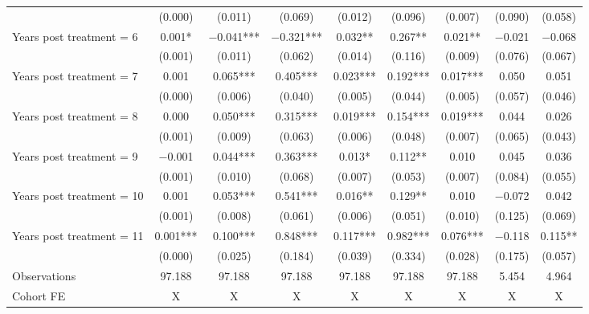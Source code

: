 \begin{table}[H]
{\begin{threeparttable}
\begin{tabular}[t]{lcccccccc}
 & (\num{0.000}) & (\num{0.011}) & (\num{0.069}) & (\num{0.012}) & (\num{0.096}) & (\num{0.007}) & (\num{0.090}) & (\num{0.058})\\
Years post treatment = 6 & \num{ 0.001}* & \num{-0.041}*** & \num{-0.321}*** & \num{0.032}** & \num{0.267}** & \num{ 0.021}** & \num{-0.021} & \num{-0.068}\\
 & (\num{0.001}) & (\num{0.011}) & (\num{0.062}) & (\num{0.014}) & (\num{0.116}) & (\num{0.009}) & (\num{0.076}) & (\num{0.067})\\
Years post treatment = 7 & \num{ 0.001} & \num{ 0.065}*** & \num{ 0.405}*** & \num{0.023}*** & \num{0.192}*** & \num{ 0.017}*** & \num{ 0.050} & \num{ 0.051}\\
 & (\num{0.000}) & (\num{0.006}) & (\num{0.040}) & (\num{0.005}) & (\num{0.044}) & (\num{0.005}) & (\num{0.057}) & (\num{0.046})\\
Years post treatment = 8 & \num{ 0.000} & \num{ 0.050}*** & \num{ 0.315}*** & \num{0.019}*** & \num{0.154}*** & \num{ 0.019}*** & \num{ 0.044} & \num{ 0.026}\\
 & (\num{0.001}) & (\num{0.009}) & (\num{0.063}) & (\num{0.006}) & (\num{0.048}) & (\num{0.007}) & (\num{0.065}) & (\num{0.043})\\
Years post treatment = 9 & \num{-0.001} & \num{ 0.044}*** & \num{ 0.363}*** & \num{0.013}* & \num{0.112}** & \num{ 0.010} & \num{ 0.045} & \num{ 0.036}\\
 & (\num{0.001}) & (\num{0.010}) & (\num{0.068}) & (\num{0.007}) & (\num{0.053}) & (\num{0.007}) & (\num{0.084}) & (\num{0.055})\\
Years post treatment = 10 & \num{ 0.001} & \num{ 0.053}*** & \num{ 0.541}*** & \num{0.016}** & \num{0.129}** & \num{ 0.010} & \num{-0.072} & \num{ 0.042}\\
 & (\num{0.001}) & (\num{0.008}) & (\num{0.061}) & (\num{0.006}) & (\num{0.051}) & (\num{0.010}) & (\num{0.125}) & (\num{0.069})\\
Years post treatment = 11 & \num{ 0.001}*** & \num{ 0.100}*** & \num{ 0.848}*** & \num{0.117}*** & \num{0.982}*** & \num{ 0.076}*** & \num{-0.118} & \num{ 0.115}**\\
 & (\num{0.000}) & (\num{0.025}) & (\num{0.184}) & (\num{0.039}) & (\num{0.334}) & (\num{0.028}) & (\num{0.175}) & (\num{0.057})\\
\midrule
Observations & \num{97,188} & \num{97,188} & \num{97,188} & \num{97,188} & \num{97,188} & \num{97,188} & \num{5,454} & \num{4,964}\\
Cohort FE & X & X & X & X & X & X & X & X\\

\end{tabular}
\end{threeparttable}}
\end{table}
